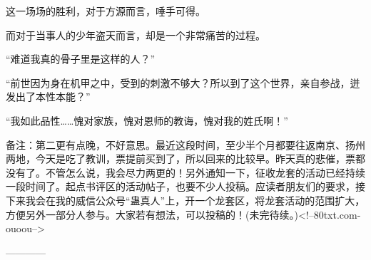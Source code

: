 \begin{this_body}
这一场场的胜利，对于方源而言，唾手可得。

而对于当事人的少年盗天而言，却是一个非常痛苦的过程。

“难道我真的骨子里是这样的人？”

“前世因为身在机甲之中，受到的刺激不够大？所以到了这个世界，亲自参战，迸发出了本性本能？”

“我如此品性……愧对家族，愧对恩师的教诲，愧对我的姓氏啊！”

备注：第二更有点晚，不好意思。最近这段时间，至少半个月都要往返南京、扬州两地，今天是吃了教训，票提前买到了，所以回来的比较早。昨天真的悲催，票都没有了。不管怎么说，我会尽力两更的！另外通知一下，征收龙套的活动已经持续一段时间了。起点书评区的活动帖子，也要不少人投稿。应读者朋友们的要求，接下来我会在我的威信公众号“蛊真人”上，开一个龙套区，将龙套活动的范围扩大，方便另外一部分人参与。大家若有想法，可以投稿的！(未完待续。)<!--80txt.com-ouoou-->

------------

\end{this_body}

